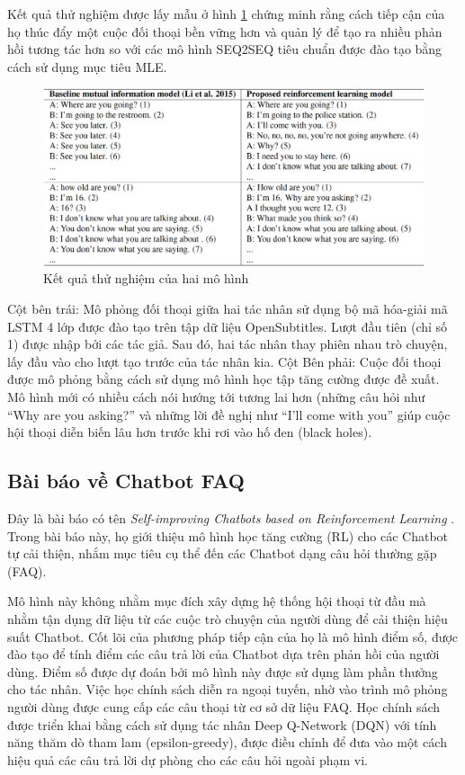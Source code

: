 Kết quả thử nghiệm được lấy mẫu ở hình \ref{fig:generationdialog}
chứng minh rằng cách tiếp cận của họ thúc đẩy một cuộc đối thoại
bền vững hơn và quản lý để tạo ra nhiều phản hồi tương tác hơn
so với các mô hình SEQ2SEQ tiêu chuẩn được đào tạo bằng cách
sử dụng mục tiêu MLE.

\begin{figure}[ht]
    \centering
    \includegraphics[width=1\textwidth]{thesis/chatbot/congtrinh/img/generationdialog.png}
    \caption{Kết quả thử nghiệm của hai mô hình}
    \label{fig:generationdialog}
\end{figure}

Cột bên trái: Mô phỏng đối thoại giữa hai tác nhân sử dụng bộ
mã hóa-giải mã LSTM 4 lớp được đào tạo trên tập dữ liệu
OpenSubtitles. Lượt đầu tiên (chỉ số 1) được nhập bởi các tác giả.
Sau đó, hai tác nhân thay phiên nhau trò chuyện, lấy đầu vào cho lượt
tạo trước của tác nhân kia. Cột Bên phải: Cuộc đối thoại được mô phỏng
bằng cách sử dụng mô hình học tập tăng cường được đề xuất. Mô hình mới
có nhiều cách nói hướng tới tương lai hơn (những câu hỏi như
\enquote{Why are you asking?} và những lời đề nghị như
\enquote{I'll come with you} giúp cuộc hội thoại diễn biến lâu hơn
trước khi rơi vào hố đen (black holes).

\subsection{Bài báo về Chatbot FAQ}
Đây là bài báo có tên \textit{Self-improving Chatbots based on
Reinforcement Learning} \cite{selfimproving}. Trong bài báo này,
họ giới thiệu mô hình học tăng cường (RL) cho các Chatbot tự
cải thiện, nhắm mục tiêu cụ thể đến các Chatbot dạng câu hỏi
thường gặp (FAQ).

Mô hình này không nhằm mục đích xây dựng hệ thống hội thoại từ đầu
mà nhằm tận dụng dữ liệu từ các cuộc trò chuyện của người dùng để
cải thiện hiệu suất Chatbot. Cốt lõi của phương pháp tiếp cận của họ
là mô hình điểm số, được đào tạo để tính điểm các câu trả lời của
Chatbot dựa trên phản hồi của người dùng. Điểm số được dự đoán bởi
mô hình này được sử dụng làm phần thưởng cho tác nhân. Việc học
chính sách diễn ra ngoại tuyến, nhờ vào trình mô phỏng người dùng
được cung cấp các câu thoại từ cơ sở dữ liệu FAQ. Học chính sách
được triển khai bằng cách sử dụng tác nhân Deep Q-Network (DQN) với
tính năng thăm dò tham lam (epsilon-greedy), được điều chỉnh để đưa
vào một cách hiệu quả các câu trả lời dự phòng cho các câu hỏi
ngoài phạm vi.


